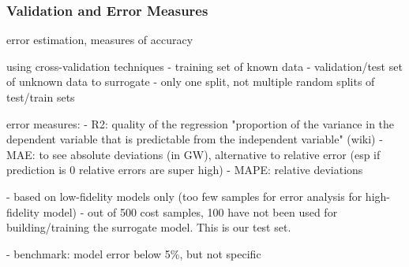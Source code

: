 \subsubsection{Validation and Error Measures}

error estimation, measures of accuracy

using cross-validation techniques 
- training set of known data
- validation/test set of unknown data to surrogate \cite{gratiet_metamodel-based_2015}
- only one split, not multiple random splits of test/train sets

error measures:
- R2: quality of the regression "proportion of the variance in the dependent variable that is predictable from the independent variable" (wiki)
- MAE: to see absolute deviations (in GW), alternative to relative error (esp if prediction is 0 relative errors are super high)
- MAPE: relative deviations

- based on low-fidelity models only (too few samples for error analysis for high-fidelity model)
- out of 500 cost samples, 100 have not been used for building/training the surrogate model. This is our test set.

- benchmark: model error below 5\%, but not specific \cite{trondle_trade-offs_2020}
